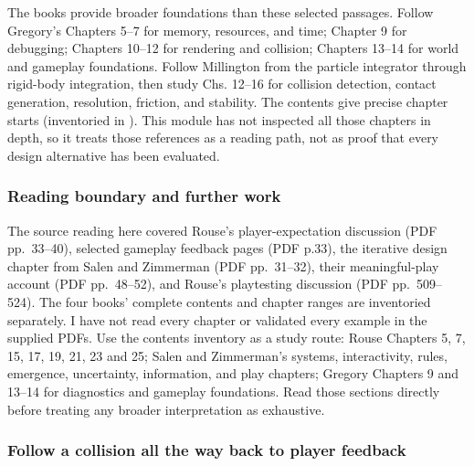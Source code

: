 The books provide broader foundations than these selected passages. Follow Gregory's Chapters 5--7 for memory, resources, and time; Chapter 9 for debugging; Chapters 10--12 for rendering and collision; Chapters 13--14 for world and gameplay foundations. Follow Millington from the particle integrator through rigid-body integration, then study Chs. 12--16 for collision detection, contact generation, resolution, friction, and stability. The contents give precise chapter starts (inventoried in ). This module has not inspected all those chapters in depth, so it treats those references as a reading path, not as proof that every design alternative has been evaluated.

\subsubsection{Reading boundary and further work}\label{06-engine-ii-ch042-reading-boundary-and-further-work}

\hypertarget{06-engine-ii-ch042-reading-boundary-and-further-work}{}

The source reading here covered Rouse's player-expectation discussion (PDF pp.~33--40), selected gameplay feedback pages (PDF p.33), the iterative design chapter from Salen and Zimmerman (PDF pp.~31--32), their meaningful-play account (PDF pp.~48--52), and Rouse's playtesting discussion (PDF pp.~509--524). The four books' complete contents and chapter ranges are inventoried separately. I have not read every chapter or validated every example in the supplied PDFs. Use the contents inventory as a study route: Rouse Chapters 5, 7, 15, 17, 19, 21, 23 and 25; Salen and Zimmerman's systems, interactivity, rules, emergence, uncertainty, information, and play chapters; Gregory Chapters 9 and 13--14 for diagnostics and gameplay foundations. Read those sections directly before treating any broader interpretation as exhaustive.

\subsubsection{Follow a collision all the way back to player feedback}\label{06-engine-ii-ch042-follow-a-collision-all-the-way-back-to-player-feedback}

\hypertarget{06-engine-ii-ch042-follow-a-collision-all-the-way-back-to-player-feedback}{}


